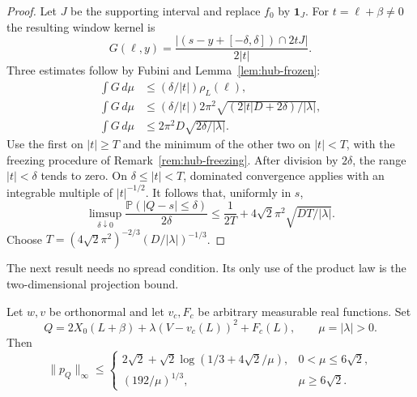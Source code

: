 \begin{proof}
Let $J$ be the supporting interval and replace $f_0$ by $\mathbf1_J$.
For $t=\ell+\beta\ne0$ the resulting window kernel is
\[
 G(\ell,y)=\frac{|(s-y+[-\delta,\delta])\cap2tJ|}{2|t|}.
\]
Three estimates follow by Fubini and
Lemma~\ref{lem:hub-frozen}:
\begin{align*}
 \int G\,d\mu&\le (\delta/|t|)\rho_L(\ell),\\
 \int G\,d\mu&\le (\delta/|t|)2\pi^2
                  \sqrt{(2|t|D+2\delta)/|\lambda|},\\
 \int G\,d\mu&\le 2\pi^2D\sqrt{2\delta/|\lambda|}.
\end{align*}
Use the first on $|t|\ge T$ and the minimum of the other two on
$|t|<T$, with the freezing procedure of
Remark~\ref{rem:hub-freezing}.  After division by $2\delta$, the range
$|t|<\delta$ tends to zero.  On $\delta\le|t|<T$, dominated
convergence applies with an integrable multiple of $|t|^{-1/2}$.
It follows that, uniformly in $s$,
\[
 \limsup_{\delta\downarrow0}
 \frac{\mathbb P(|Q-s|\le\delta)}{2\delta}
 \le\frac1{2T}+4\sqrt2\pi^2\sqrt{DT/|\lambda|}.
\]
Choose $T=(4\sqrt2\pi^2)^{-2/3}(D/|\lambda|)^{-1/3}$.
\end{proof}

The next result needs no spread condition.  Its only use of the product
law is the two-dimensional projection bound.

\begin{theorem}
\label{thm:hub-pure}
Let $w,v$ be orthonormal and let $v_c,F_c$ be arbitrary measurable
real functions.  Set
\[
 Q=2X_0(L+\beta)+\lambda(V-v_c(L))^2+F_c(L),
 \qquad \mu=|\lambda|>0.
\]
Then
\begin{equation}\label{eq:hub-pure-bound}
 \|p_Q\|_\infty\le
 \begin{cases}
 2\sqrt2+\sqrt2\log(1/3+4\sqrt2/\mu),&0<\mu\le6\sqrt2,\\
 (192/\mu)^{1/3},&\mu\ge6\sqrt2.
 \end{cases}
\end{equation}
\end{theorem}

